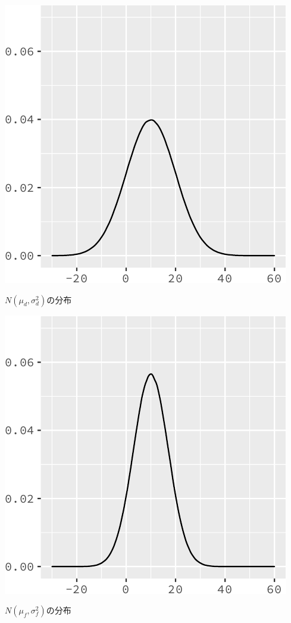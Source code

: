 \documentclass[]{tufte-handout}
\begin{document}
\begin{marginfigure}

{\centering \includegraphics{AdditivityOfVariance_files/figure-latex/unnamed-chunk-11-1} 

}

\caption[$N(\mu_d, \sigma^2_d)$の分布]{$N(\mu_d, \sigma^2_d)$の分布}\label{fig:unnamed-chunk-11}
\end{marginfigure}

\begin{marginfigure}

{\centering \includegraphics{AdditivityOfVariance_files/figure-latex/unnamed-chunk-12-1} 

}

\caption[$N(\mu_f, \sigma^2_f)$の分布]{$N(\mu_f, \sigma^2_f)$の分布}\label{fig:unnamed-chunk-12}
\end{marginfigure}
\end{document}
